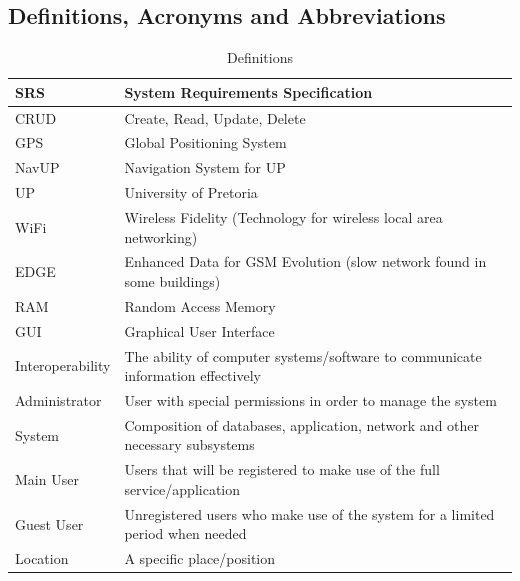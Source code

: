 \documentclass{article}
\begin{document}
	\subsection{Definitions, Acronyms and Abbreviations}
\begin{table}[h!]
\centering
\caption{Definitions}
\label{my-label}
\begin{tabular}{|l|l|}
\hline
SRS                & System Requirements Specification                                                     \\ \hline
CRUD               & Create, Read, Update, Delete                                                          \\ \hline
GPS                & Global Positioning System                                                             \\ \hline
NavUP              & Navigation System for UP                                                              \\ \hline
UP                 & University of Pretoria                                                                \\ \hline
WiFi               & Wireless Fidelity (Technology for wireless local area networking)                     \\ \hline
EDGE               & Enhanced Data for GSM Evolution (slow network found in some buildings)                \\ \hline
RAM                & Random Access Memory                                                                  \\ \hline
GUI                & Graphical User Interface                                                              \\ \hline
Interoperability   & The ability of computer systems/software to communicate information effectively       \\ \hline
Administrator      & User with special permissions in order to manage the system                           \\ \hline
System             & Composition of databases, application, network and other necessary subsystems         \\ \hline
Main User          & Users that will be registered to make use of the full service/application             \\ \hline
Guest User         & Unregistered users who make use of the system for a limited period when needed        \\ \hline
Location           & A specific place/position                                                             \\ \hline

\end{tabular}
\end{table}
\end{document}
